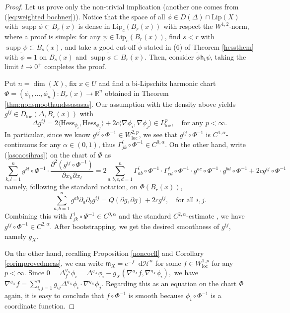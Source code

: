 \documentclass[11pt,reqno]{amsart}
\theoremstyle{definition}
\numberwithin{equation}{section}
\newcommand{\di}{\mathop{}\!\mathrm{d}}
\newcommand{\meas}{\mathfrak{m}}
\DeclareMathOperator{\loc}{loc}
\newcommand{\haus}{\mathscr{H}}
\DeclareMathOperator{\supp}{supp}
\begin{document}
\begin{proof} Let us prove only the non-trivial implication (another one comes from (\ref{eq:weighted bochner})). 
    Notice that the space of all $\phi \in D(\Delta)\cap \mathrm{Lip}(X)$ with $\supp \phi \subset B_r(x)$ is dense in $\mathrm{Lip}_c(B_r(x))$ with respect the $W^{1,2}$-norm, where a proof is simple: for any $\psi \in \mathrm{Lip}_c(B_r(x))$, find $s <r$ with $\supp \psi \subset B_s(x)$, and take a good cut-off $\tilde \phi$ stated in (6) of Theorem \ref{hessthem} with $\tilde \phi =1$ on $B_s(x)$ and $\supp \tilde \phi \subset B_r(x)$. Then, consider $\tilde \phi \mathsf{h}_t\psi$, taking the limit $t \to 0^+$ completes the proof.

    Put $n=\dim(X)$,
    fix $x \in U$ and find a bi-Lipschitz harmonic chart $\Phi=(\phi_1, \ldots, \phi_n):B_{r}(x) \to \mathbb{R}^n$ obtained in Theorem \ref{thm:nonsmoothandssasasas}.
Our assumption with the density above yields $g^{ij} \in D_{\loc}(\Delta, B_r(x))$ with
    \begin{equation}\label{asoaosihras}
    \Delta g^{ij} =2\langle \mathrm{Hess}_{\phi_i}, \mathrm{Hess}_{\phi_j}\rangle + 2c\langle \nabla \phi_i, \nabla  \phi_j\rangle \in L^p_{\loc},\quad \text{for any $p<\infty$.}
\end{equation}
In particular, since we know $g^{ij}\circ \Phi^{-1}\in W^{2, p}_{\loc}$, we see that $g^{ij}\circ \Phi^{-1}$ is $C^{1,\alpha}$-continuous for any $\alpha \in (0,1)$, thus $
    \Gamma^i_{jk}\circ \Phi^{-1} \in C^{0,\alpha}.
$
On the other hand, write (\ref{asoaosihras}) on the chart of $\Phi$ as 
\begin{equation*}
\sum_{k, l=1}^ng^{kl}\circ \Phi^{-1}\cdot \frac{\partial^2 (g^{ij}\circ \Phi^{-1})}{\partial x_k\partial x_l}=2\sum_{a, b, c, d=1}^n\Gamma^i_{ab}\circ \Phi^{-1} \cdot \Gamma^j_{cd}\circ \Phi^{-1}\cdot g^{ac}\circ \Phi^{-1}\cdot g^{bd}\circ \Phi^{-1} + 2c g^{ij}\circ \Phi^{-1} 
\end{equation*}
namely, following the standard notation, on $\Phi(B_r(x))$,
\begin{equation}\label{einstein}
    \sum_{a,b=1}^ng^{ab}\partial_a\partial_bg^{ij}=Q(\partial g, \partial g)+2c g^{ij}, \quad \text{for all $i, j$.}
\end{equation}
    Combining this with $\Gamma^i_{jk}\circ \Phi^{-1} \in C^{0,\alpha}$ and the standard $C^{2,\alpha}$-estimate \cite[Theorem 9.19]{GT}, we have $g^{ij} \circ \Phi^{-1}\in C^{2, \alpha}$. After bootstrapping, we get the desired smoothness of $g^{ij}$, namely $g_X$.

    On the other hand, recalling Proposition \ref{noncocll} and Corollary \ref{corimprovedmeas}, we can write $\meas_X=e^{-f}\di \haus^n$ for some $f \in W^{1,p}_{\loc}$ for any $p<\infty$. Since
$
0=\Delta^{g_X}_f\phi_i=\Delta^{g_X}\phi_i-g_X(\nabla^{g_X}f, \nabla^{g_X} \phi_i),
$
we have $
\nabla^{g_X}f=\sum_{i,j=1}^n g_{ij}\Delta^{g_X}\phi_i\cdot \nabla^{g_X}\phi_j.
$
Regarding this as an equation on the chart $\Phi$ again, it is easy to conclude that $f \circ \Phi^{-1}$ is smooth because $\phi_i \circ \Phi^{-1}$ is a coordinate function. 
\end{proof}
\end{document}
